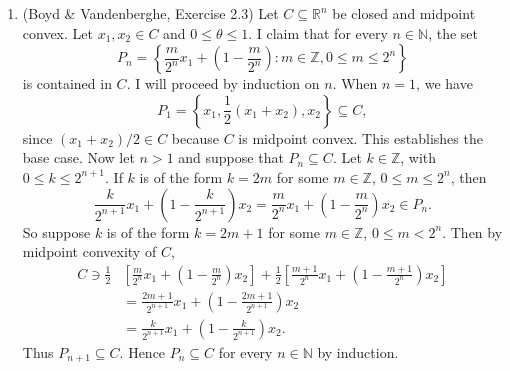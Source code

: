 \documentclass[letterpaper,12pt]{article}
\begin{document}
\begin{enumerate}
\item (Boyd \& Vandenberghe, Exercise 2.3) Let
  $C \subseteq \mathbb{R}^n$ be closed and midpoint convex. Let
  $x_1, x_2 \in C$ and $0 \leq \theta \leq 1$. I claim that for every
  $n \in \mathbb{N}$, the set
  \begin{equation*}
    P_n = \left \{ \frac{m}{2^n} x_1 + \left ( 1 - \frac{m}{2^n} \right ) :
      m \in \mathbb{Z}, 0 \leq m \leq 2^n \right \}
  \end{equation*}
  is contained in $C$. I will proceed by induction on $n$. When
  $n = 1$, we have
  \begin{equation*}
    P_1 = \left \{ x_1, \frac{1}{2} (x_1 + x_2), x_2 \right \} \subseteq C,
  \end{equation*}
  since $(x_1 + x_2) / 2 \in C$ because $C$ is midpoint convex. This
  establishes the base case. Now let $n > 1$ and suppose that
  $P_n \subseteq C$. Let $k \in \mathbb{Z}$, with
  $0 \leq k \leq 2^{n+1}$. If $k$ is of the form $k = 2m$ for some
  $m \in \mathbb{Z}$, $0 \leq m \leq 2^n$, then
  \begin{equation*}
    \frac{k}{2^{n+1}} x_1 + \left ( 1 - \frac{k}{2^{n+1}} \right ) x_2
      = \frac{m}{2^n} x_1 + \left ( 1 - \frac{m}{2^n} \right ) x_2 \in P_n.
  \end{equation*}
  So suppose $k$ is of the form $k = 2m + 1$ for some
  $m \in \mathbb{Z}$, $0 \leq m < 2^n$. Then by midpoint convexity of
  $C$,
  \begin{align*}
    C \ni \frac{1}{2}& \left [ \frac{m}{2^n} x_1 +
      \left ( 1 - \frac{m}{2^n} \right ) x_2 \right ] +
    \frac{1}{2} \left [ \frac{m + 1}{2^n} x_1 +
      \left ( 1 - \frac{m + 1}{2^n} \right ) x_2 \right ] \\
    &= \frac{2m + 1}{2^{n+1}} x_1 +
         \left ( 1 - \frac{2m + 1}{2^{n+1}} \right ) x_2 \\
    &= \frac{k}{2^{n+1}} x_1 + \left ( 1 - \frac{k}{2^{n+1}} \right ) x_2.
  \end{align*}
  Thus $P_{n+1} \subseteq C$. Hence $P_n \subseteq C$ for every
  $n \in \mathbb{N}$ by induction.


\end{enumerate}
\end{document}
